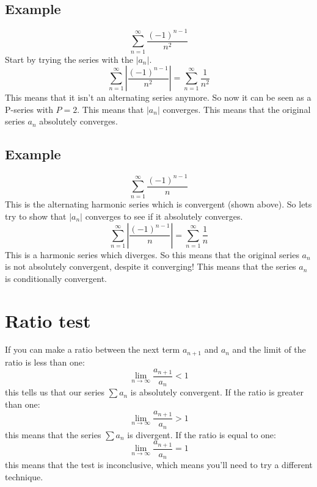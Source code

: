 \documentclass{article}
\begin{document}
    
    \subsection{Example}
        \[\sum_{n = 1}^{\infty} \frac{(-1)^{n-1}}{n^2}\]
        Start by trying the series with the \(|a_n|\).
        \[\sum_{n = 1}^{\infty} \left| \frac{(-1)^{n-1}}{n^2} \right| = \sum_{n = 1}^{\infty} \frac{1}{n^2} \]
        This means that it isn't an alternating series anymore. So now it can be seen as a P-series with \(P = 2\). This means that \(|a_n|\) converges.
        This means that the original series \(a_n\) absolutely converges.
    
    \subsection{Example}
        \[\sum_{n = 1}^{\infty} \frac{(-1)^{n-1}}{n}\]
        This is the alternating harmonic series which is convergent (shown above). So lets try to show that \(|a_n|\) converges to see if it absolutely converges.
        \[\sum_{n = 1}^{\infty} \left| \frac{(-1)^{n-1}}{n} \right| = \sum_{n = 1}^{\infty} \frac{1}{n} \]
        This is a harmonic series which diverges. So this means that the original series \(a_n\) is not absolutely convergent, despite it converging! 
        This means that the series \(a_n\) is conditionally convergent.

\newpage
\section{Ratio test}
    If you can make a ratio between the next term \(a_{n+1}\) and \(a_n\) and the limit of the ratio is less than one:
    \[\lim_{n \to \infty} \frac{a_{n+1}}{a_n} < 1 \]
    this tells us that our series \(\sum a_n\) is absolutely convergent.
    If the ratio is greater than one:
    \[\lim_{n \to \infty} \frac{a_{n+1}}{a_n} > 1 \]
    this means that the series \(\sum a_n\) is divergent.
    If the ratio is equal to one:
    \[\lim_{n \to \infty} \frac{a_{n+1}}{a_n} = 1 \]
    this means that the test is inconclusive, which means you'll need to try a different technique.
    
\end{document}
